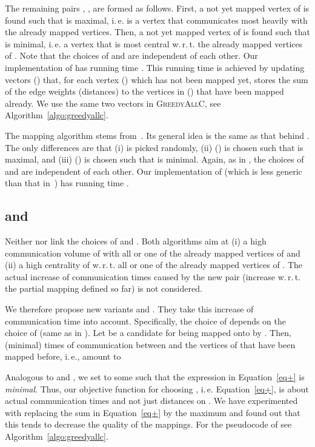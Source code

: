 \documentclass[pdftex]{llncs}
\newcommand{\ie}{i.\,e.\xspace}
\newcommand{\wrt}{w.\,r.\,t.\xspace}
\newcommand{\greedyallc}{\textsc{GreedyAllC}\xspace}
\begin{document}
The remaining pairs , , are formed as
follows. First, a not yet mapped vertex  of  is found such
that  is maximal, \ie
 is a vertex that communicates most heavily with the already
mapped vertices. Then, a not yet mapped vertex  of  is
found such that  is minimal, \ie a
vertex that is most central \wrt the already mapped vertices of
. Note that the choices of  and  are independent of
each other. Our implementation of  has running time
. This running time is achieved by updating
vectors  () that, for each vertex  () which
has not been mapped yet, stores the sum of the edge weights
(distances) to the vertices in  () that have been mapped
already. We use the same two vectors in \greedyallc, see
Algorithm~\ref{algo:greedyallc}.

\label{sec:greedymin}
The mapping algorithm  stems
from~\cite{hoefler-topomap}. Its general idea is the same as that
behind . The only differences are that (i)  is
picked randomly, (ii)  () is chosen such that
 is maximal, and (iii)
 () is chosen such that  is
minimal. Again, as in , the choices of  and 
are independent of each other. Our implementation of 
(which is less generic than that in~\cite{hoefler-topomap}) has
running time .

\subsection{ and }
\label{sec:greedy+}
Neither  nor  link the choices of  and
. Both algorithms aim at (i) a high communication volume of
 with all or one of the already mapped vertices of  and
(ii) a high centrality of  \wrt all or one of the already
mapped vertices of . The actual increase of communication times
caused by the new pair  (increase \wrt the partial
mapping defined so far) is not considered.
 
We therefore propose new variants  and
. They take this increase of communication time into
account. Specifically, the choice of  depends on the choice of
 (same as in ). Let
 be a candidate for being mapped onto by . Then, (minimal)
times of communication between  and the vertices of  that
have been mapped before, \ie , amount to



Analogous to  and , we set  to some
 such that the expression in Equation~\ref{eq+} is
\emph{minimal}. Thus, our objective function for choosing , \ie
Equation~\ref{eq+}, is about actual communication times and not just
distances on . We have experimented with replacing the sum in
Equation~\ref{eq+} by the maximum and found out that this tends to
decrease the quality of the mappings. For the pseudocode of
 see Algorithm~\ref{algo:greedyallc}.
\end{document}
